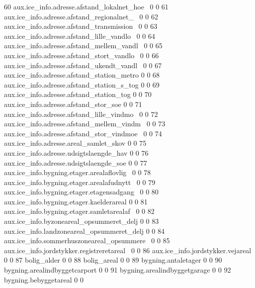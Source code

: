 \documentclass{report}
\begin{document}
\begin{Schunk}
\begin{Soutput}
 60 aux.ice_info.adresse.afstand_lokalnet_hoe~               0              0   
 61 aux.ice_info.adresse.afstand_regionalnet_~               0              0   
 62 aux.ice_info.adresse.afstand_transmission~               0              0   
 63 aux.ice_info.adresse.afstand_lille_vandlo~               0              0   
 64 aux.ice_info.adresse.afstand_mellem_vandl~               0              0   
 65 aux.ice_info.adresse.afstand_stort_vandlo~               0              0   
 66 aux.ice_info.adresse.afstand_ukendt_vandl~               0              0   
 67 aux.ice_info.adresse.afstand_station_metro               0              0   
 68 aux.ice_info.adresse.afstand_station_s_tog               0              0   
 69 aux.ice_info.adresse.afstand_station_tog                 0              0   
 70 aux.ice_info.adresse.afstand_stor_soe                    0              0   
 71 aux.ice_info.adresse.afstand_lille_vindmo~               0              0   
 72 aux.ice_info.adresse.afstand_mellem_vindm~               0              0   
 73 aux.ice_info.adresse.afstand_stor_vindmoe~               0              0   
 74 aux.ice_info.adresse.areal_samlet_skov                   0              0   
 75 aux.ice_info.adresse.udsigtslaengde_hav                  0              0   
 76 aux.ice_info.adresse.udsigtslaengde_soe                  0              0   
 77 aux.ice_info.bygning.etager.arealaflovlig~               0              0   
 78 aux.ice_info.bygning.etager.arealafudnytt~               0              0   
 79 aux.ice_info.bygning.etager.etagensadgang~               0              0   
 80 aux.ice_info.bygning.etager.kaelderareal                 0              0   
 81 aux.ice_info.bygning.etager.samletarealaf~               0              0   
 82 aux.ice_info.byzoneareal_opsummeret_delj                 0              0   
 83 aux.ice_info.landzoneareal_opsummeret_delj               0              0   
 84 aux.ice_info.sommerhuszoneareal_opsummere~               0              0   
 85 aux.ice_info.jordstykker.registreretareal~               0              0   
 86 aux.ice_info.jordstykker.vejareal                        0              0   
 87 bolig_alder                                              0              0   
 88 bolig_areal                                              0              0   
 89 bygning.antaletager                                      0              0   
 90 bygning.arealindbyggetcarport                            0              0   
 91 bygning.arealindbyggetgarage                             0              0   
 92 bygning.bebyggetareal                                    0              0   

\end{Soutput}
\end{Schunk}
\end{document}
